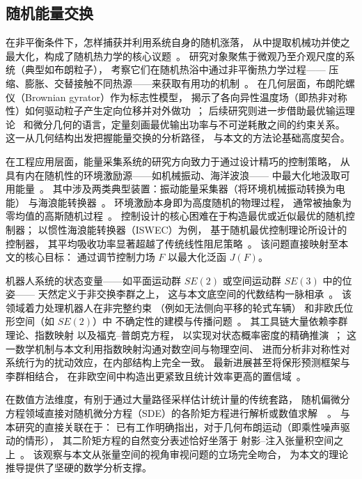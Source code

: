 ﻿\documentclass[10pt,a4paper]{article}
\numberwithin{equation}{section}
\begin{document}
\subsection{随机能量交换}

在非平衡条件下，怎样捕获并利用系统自身的随机涨落，
从中提取机械功并使之最大化，构成了随机热力学的核心议题~\cite{Seifert2012Stochastic, Esposito2010Entropy}。
研究对象聚焦于微观乃至介观尺度的系统（典型如布朗粒子），
考察它们在随机热浴中通过非平衡热力学过程——
压缩、膨胀、交替接触不同热源——来获取有用功的机制~\cite{Kramers1940Brownian, Jarzynski1997Nonequilibrium}。
在几何层面，布朗陀螺仪（Brownian gyrator）作为标志性模型，
揭示了各向异性温度场（即热非对称性）如何驱动粒子产生定向位移并对外做功~\cite{Filippetti2021Brownian, Sasa2014Stochastic}；
后续研究则进一步借助最优输运理论~\cite{Villani2009Optimal}
和微分几何的语言，定量刻画最优输出功率与不可逆耗散之间的约束关系。
这一从几何结构出发把握能量交换的分析路径，
与本文的方法论基础高度契合。

在工程应用层面，能量采集系统的研究方向致力于通过设计精巧的控制策略，
从具有内在随机性的环境激励源——如机械振动、海洋波浪——
中最大化地汲取可用能量~\cite{Zuo2013Energy, Ding2019Energy}。
其中涉及两类典型装置：振动能量采集器（将环境机械振动转换为电能）
与海浪能转换器~\cite{Falnes2002Ocean, Li2019Review}。
环境激励本身即为高度随机的物理过程，
通常被抽象为零均值的高斯随机过程~\cite{Rice1944Mathematical}。
控制设计的核心困难在于构造最优或近似最优的随机控制器；
以惯性海浪能转换器（ISWEC）为例，
基于随机最优控制理论所设计的控制器，
其平均吸收功率显著超越了传统线性阻尼策略~\cite{Giorgi2020Nonlinear, Paduano2021Control}。
该问题直接映射至本文的核心目标：
通过调节控制力场 $F$ 以最大化泛函 $J(F)$。

机器人系统的状态变量——如平面运动群 $SE(2)$ 或空间运动群 $SE(3)$ 中的位姿——
天然定义于非交换李群之上，
这与本文底空间的代数结构一脉相承~\cite{Murray1994Mathematical, Barfoot2017State}。
该领域着力处理机器人在非完整约束
（例如无法侧向平移的轮式车辆）
和非欧氏位形空间（如 $SE(2)$）中
不确定性的建模与传播问题~\cite{Bloch2003Nonholonomic, Bloch2015Geometric}。
其工具链大量依赖李群理论、指数映射
以及福克--普朗克方程，
以实现对状态概率密度的精确推演~\cite{Wang2019Lie, Solin2015Gaussian}；
这一数学机制与本文利用指数映射沟通对数空间与物理空间、
进而分析非对称性对系统行为的扰动效应，在内部结构上完全一致。
最新进展甚至将保形预测框架与李群相结合，
在非欧空间中构造出更紧致且统计效率更高的置信域~\cite{Klein2023Conformal}。

在数值方法维度，有别于通过大量路径采样估计统计量的传统套路，
随机偏微分方程领域直接对随机微分方程（SDE）的各阶矩方程进行解析或数值求解~\cite{Pardoux2007Stochastic, Hairer2011Ergodicity}~\cite{Jentzen2010Taylor, Kloeden2012Numerical}。
与本研究的直接关联在于：
已有工作明确指出，对于几何布朗运动（即乘性噪声驱动的情形），
其二阶矩方程的自然变分表述恰好坐落于
射影--注入张量积空间之上~\cite{Lang2017Stochastic, Flandoli2018Regularization}。
该观察与本文从张量空间的视角审视问题的立场完全吻合，
为本文的理论推导提供了坚硬的数学分析支撑。
\end{document}
